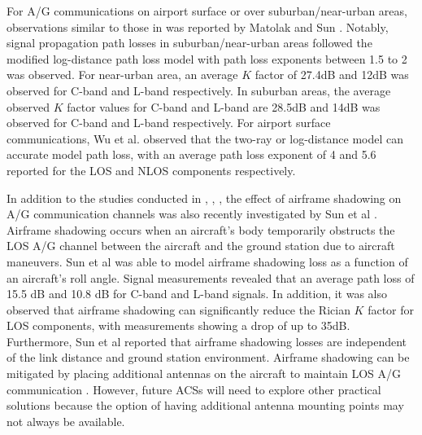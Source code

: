 For A/G communications on airport surface or over suburban/near-urban areas, observations similar to those in \cite{sun2017air_hilly} was reported by Matolak and Sun \cite{matolak2017air_suburban}. Notably, signal propagation path losses in suburban/near-urban areas followed the modified log-distance path loss model with path loss exponents between 1.5 to 2 was observed. For near-urban area, an average $K$ factor of 27.4dB and 12dB was observed for C-band and L-band respectively. In suburban areas, the average observed $K$ factor values for C-band and L-band are 28.5dB and 14dB was observed for C-band and L-band respectively. For airport surface communications, Wu et al. \cite{wu2011airport} observed that the two-ray or log-distance model can accurate model path loss, with an average path loss exponent of 4 and 5.6 reported for the LOS and NLOS components respectively. 

In addition to the studies conducted in \cite{matolak2017air_water}, \cite{sun2017air_hilly}, \cite{matolak2017air_suburban}, the effect of airframe shadowing on A/G communication channels was also recently investigated by Sun et al \cite{sun2017air_shadowing}. Airframe shadowing occurs when an aircraft's body temporarily obstructs the LOS A/G channel between the aircraft and the ground station due to aircraft maneuvers. Sun et al \cite{sun2017air_shadowing} was able to model airframe shadowing loss as a function of an aircraft's roll angle. Signal measurements revealed that an average path loss of 15.5 dB and 10.8 dB for C-band and L-band signals. In addition, it was also observed that airframe shadowing can significantly reduce the Rician $K$ factor for LOS components, with measurements showing a drop of up to 35dB. Furthermore, Sun et al \cite{sun2017air_shadowing} reported that airframe shadowing losses are independent of the link distance and ground station environment. Airframe shadowing can be mitigated by placing additional antennas on the aircraft to maintain LOS A/G communication \cite{sun2017air_shadowing}. However, future ACSs will need to explore other practical solutions because the option of having additional antenna mounting points may not always be available.

\begin{table}[]
\centering
\caption{A summary of propagation environments over various types of terrain.} 
\label{table:propTerrain}
\end{table}

